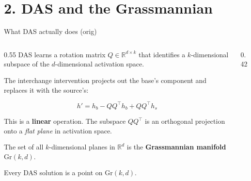 \documentclass[aspectratio=169,11pt]{beamer}
\newcommand{\Gr}{\mathrm{Gr}}
\newcommand{\R}{\mathbb{R}}
\begin{document}
\section{2. DAS and the Grassmannian}

\begin{frame}{What DAS actually does {\normalsize\textcolor{neutral}{(orig)}}}

\begin{columns}[T]
\begin{column}{0.55\textwidth}
{\small DAS learns a rotation matrix $Q \in \R^{d \times k}$ that identifies a $k$-dimensional subspace of the $d$-dimensional activation space.}

\vspace{0.3em}
{\small The interchange intervention projects out the base's component and replaces it with the source's:}

$$h' = h_b - QQ^\top h_b + QQ^\top h_s$$

{\small This is a \textbf{linear} operation. The subspace $QQ^\top$ is an orthogonal projection onto a \emph{flat plane} in activation space.}

\vspace{0.3em}
{\small The set of all $k$-dimensional planes in $\R^d$ is the \textbf{Grassmannian manifold} $\Gr(k,d)$.}

\vspace{0.3em}
{\small Every DAS solution is a point on $\Gr(k,d)$.}
\end{column}
\begin{column}{0.42\textwidth}
\end{column}
\end{columns}
\end{frame}
\end{document}

